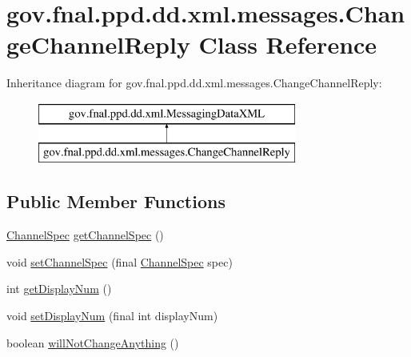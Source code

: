 \hypertarget{classgov_1_1fnal_1_1ppd_1_1dd_1_1xml_1_1messages_1_1ChangeChannelReply}{\section{gov.\-fnal.\-ppd.\-dd.\-xml.\-messages.\-Change\-Channel\-Reply Class Reference}
\label{classgov_1_1fnal_1_1ppd_1_1dd_1_1xml_1_1messages_1_1ChangeChannelReply}
}
Inheritance diagram for gov.\-fnal.\-ppd.\-dd.\-xml.\-messages.\-Change\-Channel\-Reply\-:\begin{figure}[H]
\begin{center}
\leavevmode
\includegraphics[height=2.000000cm]{classgov_1_1fnal_1_1ppd_1_1dd_1_1xml_1_1messages_1_1ChangeChannelReply}
\end{center}
\end{figure}
\subsection*{Public Member Functions}
\begin{DoxyCompactItemize}
\item 
\hyperlink{classgov_1_1fnal_1_1ppd_1_1dd_1_1xml_1_1ChannelSpec}{Channel\-Spec} \hyperlink{classgov_1_1fnal_1_1ppd_1_1dd_1_1xml_1_1messages_1_1ChangeChannelReply_a2148d067969233f3f58b5c5f24dfef5d}{get\-Channel\-Spec} ()
\item 
void \hyperlink{classgov_1_1fnal_1_1ppd_1_1dd_1_1xml_1_1messages_1_1ChangeChannelReply_a7d44da591c536ef713b7da33684c9e2c}{set\-Channel\-Spec} (final \hyperlink{classgov_1_1fnal_1_1ppd_1_1dd_1_1xml_1_1ChannelSpec}{Channel\-Spec} spec)
\item 
int \hyperlink{classgov_1_1fnal_1_1ppd_1_1dd_1_1xml_1_1messages_1_1ChangeChannelReply_a3fe315759677642f71643776a0ae8e61}{get\-Display\-Num} ()
\item 
void \hyperlink{classgov_1_1fnal_1_1ppd_1_1dd_1_1xml_1_1messages_1_1ChangeChannelReply_a07acaf38256ba11733e5edc51c3559ea}{set\-Display\-Num} (final int display\-Num)
\item 
boolean \hyperlink{classgov_1_1fnal_1_1ppd_1_1dd_1_1xml_1_1messages_1_1ChangeChannelReply_ac7d11eba4eae1008866013dd26c9f998}{will\-Not\-Change\-Anything} ()
\end{DoxyCompactItemize}


